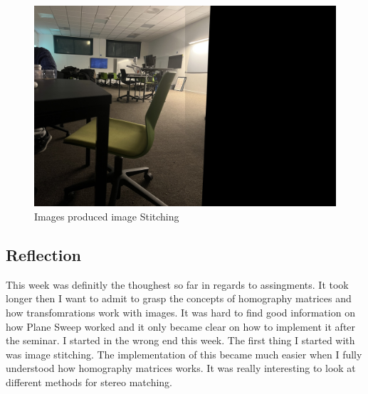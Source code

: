 \documentclass{article}
\begin{document}
    \begin{figure}[H]
        \centering
        \includegraphics[width=1\textwidth]{output.jpg}
        \caption{Images produced image Stitching}
        \label{fig:stiched}
    \end{figure}

    \subsection{Reflection}
    This week was definitly the thoughest so far in regards to assingments. It took longer then I want to admit
    to grasp the concepts of homography matrices and how transfomrations work with images. It was hard to find good
    information on how Plane Sweep worked and it only became clear on how to implement it after the seminar. I started
    in the wrong end this week. The first thing I started with was image stitching. The implementation of this became 
    much easier when I fully understood how homography matrices works. It was really interesting to look at different
    methods for stereo matching.
    
    \newpage
    \printbibliography
\end{document}
